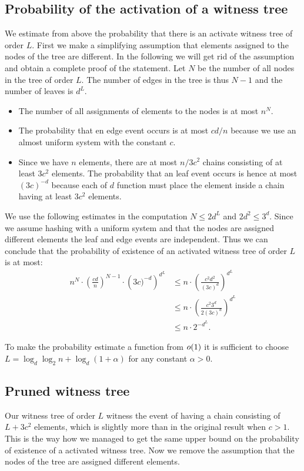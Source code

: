\subsection{Probability of the activation of a witness tree}
We estimate from above the probability that there is an activate witness tree of order $L$.
First we make a simplifying assumption that elements assigned to the nodes of the tree are different.
In the following we will get rid of the assumption and obtain a complete proof of the statement.
Let $N$ be the number of all nodes in the tree of order $L$. The number of edges in the tree is thus $N - 1$ and the number of leaves is $d^L$.
\begin{itemize}
	\item The number of all assignments of elements to the nodes is at most $n^N$.
	\item The probability that en edge event occurs is at most ${cd}/{n}$ because we use an almost uniform system with the constant $c$.
	\item 
		Since we have $n$ elements, there are at most ${n}/{3c^2}$ chains consisting of at least $3c^2$ elements.
		The probability that an leaf event occurs is hence at most $({3c})^{-d}$ because each of $d$ function must place the element inside a chain having at least $3c^2$ elements.
\end{itemize}

We use the following estimates in the computation $N \leq 2d^L$ and $2d^2 \leq 3^d$.
Since we assume hashing with a uniform system and that the nodes are assigned different elements the leaf and edge events are independent.
Thus we can conclude that the probability of existence of an activated witness tree of order $L$ is at most:
\[
\begin{split}
n^N \cdot \left(\frac{cd}{n}\right)^{N - 1} \cdot \left({3c})^{-d}\right)^{d^L} 
	& \leq n \cdot \left(\frac{c^2 d^2}{(3c)^{d}}\right)^{d^L} \\
	& \leq n \cdot \left(\frac{c^2 3^d}{2(3c)^{d}}\right)^{d^L} \\
	& \leq n \cdot 2^{-d^L}.
\end{split}
\]

To make the probability estimate a function from $o(1)$ it is sufficient to choose $L = \log_d \log_2 n + \log_d(1 + \alpha)$ for any constant $\alpha > 0$.

\subsection{Pruned witness tree}
Our witness tree of order $L$ witness the event of having a chain consisting of $L + 3c^2$ elements, which is slightly more than in the original result when $c > 1$.
This is the way how we managed to get the same upper bound on the probability of existence of a activated witness tree.
Now we remove the assumption that the nodes of the tree are assigned different elements.

